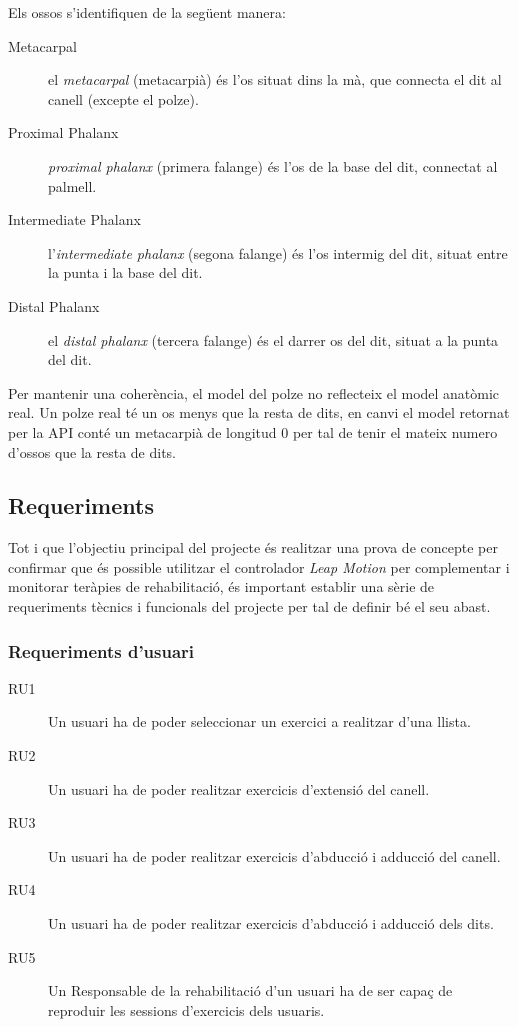 \documentclass[12pt,a4paper,catalan]{article}
\begin{document}
	Els ossos s'identifiquen de la següent manera:
	\begin{description}
		\item[Metacarpal] el \textit{metacarpal} (metacarpià) és l'os situat dins la mà, que connecta el dit al canell (excepte el polze).
		\item[Proximal Phalanx] \textit{proximal phalanx} (primera falange) és l'os de la base del dit, connectat al palmell.
		\item[Intermediate Phalanx] l'\textit{intermediate phalanx} (segona falange) és l'os intermig del dit, situat entre la punta i la base del dit.
		\item[Distal Phalanx] el \textit{distal phalanx} (tercera falange) és el darrer os del dit, situat a la punta del dit.
	\end{description}
	Per mantenir una coherència, el model del polze no reflecteix el model anatòmic real. Un polze real té un os menys que la resta de dits, en canvi el model retornat per la API conté un metacarpià de longitud 0 per tal de tenir el mateix numero d'ossos que la resta de dits.
	\subsection{Requeriments}
	Tot i que l'objectiu principal del projecte és realitzar una prova de concepte per confirmar que és possible utilitzar el controlador \textit{Leap Motion} per complementar i monitorar teràpies de rehabilitació, és important establir una sèrie de requeriments tècnics i funcionals del projecte per tal de definir bé el seu abast.
	\subsubsection*{Requeriments d'usuari}
	\begin{description}
		\item [RU1] Un usuari ha de poder seleccionar un exercici a realitzar d'una llista.
		\item [RU2] Un usuari ha de poder realitzar exercicis d'extensió del canell.
		\item [RU3] Un usuari ha de poder realitzar exercicis d'abducció i adducció del canell.
		\item [RU4] Un usuari ha de poder realitzar exercicis d'abducció i adducció dels dits.
		\item [RU5] Un Responsable de la rehabilitació d'un usuari ha de ser capaç de reproduir les sessions d'exercicis dels usuaris.
	\end{description}
\end{document}
